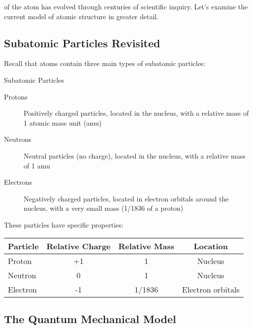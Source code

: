  of the atom has evolved through centuries of scientific inquiry. Let's examine the current model of atomic structure in greater detail.

\subsection{Subatomic Particles Revisited}

Recall that atoms contain three main types of subatomic particles:

\begin{keyconcept}{Subatomic Particles}
\begin{description}
    \item[Protons] Positively charged particles, located in the nucleus, with a relative mass of 1 atomic mass unit (amu)
    \item[Neutrons] Neutral particles (no charge), located in the nucleus, with a relative mass of 1 amu
    \item[Electrons] Negatively charged particles, located in electron orbitals around the nucleus, with a very small mass (1/1836 of a proton)
\end{description}
\end{keyconcept}

These particles have specific properties:

\begin{center}
\begin{tabular}{|l|c|c|c|}
\hline
\textbf{Particle} & \textbf{Relative Charge} & \textbf{Relative Mass} & \textbf{Location} \\
\hline
Proton & +1 & 1 & Nucleus \\
\hline
Neutron & 0 & 1 & Nucleus \\
\hline
Electron & -1 & 1/1836 & Electron orbitals \\
\hline
\end{tabular}
\end{center}


\subsection{The Quantum Mechanical Model}

